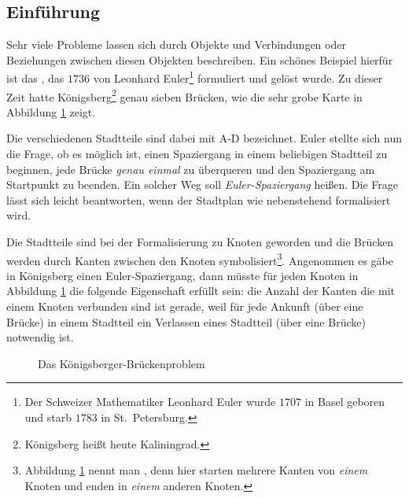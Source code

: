 \subsection{Einführung}
Sehr viele Probleme lassen sich durch Objekte und Verbindungen oder
Beziehungen zwischen diesen Objekten beschreiben. Ein schönes Beispiel
hierfür ist das 
, das $1736$ 
von Leonhard Euler\footnote{Der Schweizer Mathematiker Leonhard Euler 
wurde $1707$ in Basel geboren und starb $1783$ in St.~Petersburg.}  
formuliert und gelöst wurde. Zu dieser Zeit hatte 
Königsberg\footnote{Königsberg heißt heute Kaliningrad.} genau sieben 
Brücken, wie die sehr grobe Karte in Abbildung \ref{BProb2} zeigt.

Die verschiedenen Stadtteile sind dabei mit A-D bezeichnet. Euler
stellte sich nun die Frage, ob es möglich ist, einen Spaziergang in
einem beliebigen Stadtteil zu beginnen, jede Brücke \emph{genau
einmal} zu überqueren und den Spaziergang am Startpunkt zu
beenden. Ein solcher Weg soll \emph{Euler-Spaziergang} heißen. Die
Frage lässt sich leicht beantworten, wenn der Stadtplan wie nebenstehend
formalisiert wird.

Die Stadtteile sind bei der Formalisierung zu Knoten geworden und die
Brücken werden durch Kanten zwischen den Knoten
symbolisiert\footnote{Abbildung \ref{BProb2} nennt
man , denn hier starten mehrere Kanten von
\emph{einem} Knoten und enden in \emph{einem} anderen Knoten.}.
Angenommen es gäbe in Königsberg einen Euler-Spazier\-gang, dann müsste für jeden
Knoten in Abbildung \ref{BProb2} die folgende Eigenschaft erfüllt
sein: die Anzahl der Kanten die mit einem Knoten verbunden sind ist
gerade, weil für jede Ankunft (über eine Brücke) in einem Stadtteil
ein Verlassen eines Stadtteil (über eine Brücke) notwendig ist.
\begin{figure}
\centering
{}
\hfill
{}
\caption{Das Königsberger-Brückenproblem}
\label{BProb2}
\end{figure}

